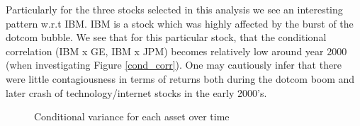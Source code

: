 \documentclass{EconHomework}
\begin{document}
\bigskip

Particularly for the three stocks selected in this analysis we see an interesting pattern w.r.t IBM. IBM is a stock which was highly affected by the burst of the dotcom bubble. We see that for this particular stock, that the conditional correlation (IBM x GE, IBM x JPM) becomes relatively low around year 2000 (when investigating Figure \ref{cond_corr}). One may cautiously infer that there were little contagiousness in terms of returns both during the dotcom boom and later crash of technology/internet stocks in the early 2000's.

\begin{figure}[htbp]
  \centering
  
  \caption{Conditional variance for each asset over time}
  \label{cond_var}
\end{figure}





\end{document}
